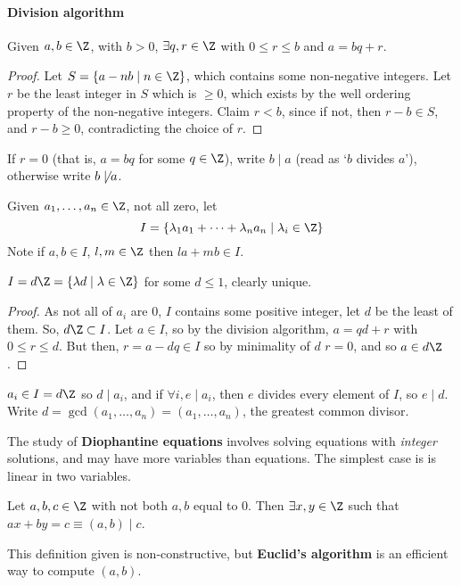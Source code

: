\documentclass{article}
\begin{document}
\paragraph{Division algorithm} Given $a, b \in \Z$, with $b > 0$, $\exists q, r \in \Z$ with $0 \leq r \leq b$ and $a = b q + r$.
\begin{proof}
    Let $S = \{a - n b \mid n \in \Z\}$, which contains some non-negative integers. Let $r$ be the least integer in $S$ which is $\geq 0$, which exists by the well ordering property of the non-negative integers.  Claim $r < b$, since if not, then $r - b \in S$, and $r - b \geq 0$, contradicting the choice of $r$.
\end{proof}
\begin{notation}
    If $r = 0$ (that is, $a = bq$ for some $q \in \Z$), write $b \mid a$ (read as `$b$ divides $a$'), otherwise write $b \not \mid a$.
\end{notation}
Given $a_1, \dots, a_n \in \Z$, not all zero, let
\begin{equation}
    I = \{\lambda_1 a_1 + \dots + \lambda_n a_n \mid \lambda_i \in \Z\}
\end{equation}
Note if $a, b \in I$, $l, m \in \Z$ then $l a + m b \in I$.
\begin{nlemma}
    $I = d \Z = \{\lambda d \mid \lambda \in \Z\}$ for some $d \leq 1$, clearly unique.
\end{nlemma}
\begin{proof}
    As not all of $a_i$ are $0$, $I$ contains some positive integer, let $d$ be the least of them.  So, $d \Z \subset I$.  Let $a \in I$, so by the division algorithm, $a = qd + r$ with $0 \leq r \le d$. But then, $r = a - dq \in I$ so by minimality of $d$ $r = 0$, and so $a \in d \Z$.
\end{proof}
\begin{remark}
    $a_i \in I = d \Z$ so $d \mid a_i$, and if $\forall i, e \mid a_i$, then $e$ divides every element of $I$, so $e \mid d$.
    Write $d = \gcd(a_1, \dots, a_n) = (a_1, \dots, a_n)$, the greatest common divisor.
\end{remark}

The study of \textbf{Diophantine equations} involves solving equations with \emph{integer} solutions, and may have more variables than equations.  The simplest case is is linear in two variables.
\begin{cor}
    Let $a, b, c \in \Z$ with not both $a, b$ equal to $0$.  Then $\exists x, y \in \Z$ such that $a x + by = c \equiv (a, b) \mid c$.
\end{cor}
This definition given is non-constructive, but \textbf{Euclid's algorithm} is an efficient way to compute $(a, b)$.
\end{document}
